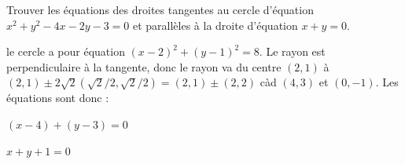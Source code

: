 \begin{frame}
  \begin{enonce}
Trouver les équations des droites tangentes au cercle d'équation $x^2+y^2-4x-2y-3=0$ et parall\`eles \`a la droite d'équation $x+y=0$.
\end{enonce}

\begin{answer}
le cercle a pour équation \((x-2)^{2} + (y - 1)^{2} = 8\). Le rayon est perpendiculaire à la tangente, donc le rayon va du centre \((2,1)\) à \((2,1) \pm 2 \sqrt{2} (\sqrt{2}/2,\sqrt{2}/2) = (2,1) \pm (2,2)\) càd \((4,3)\) et \((0,-1)\). Les équations sont donc :

\((x-4) + (y - 3) = 0\)


\(x + y + 1 = 0\)
\end{answer}
\end{frame}
